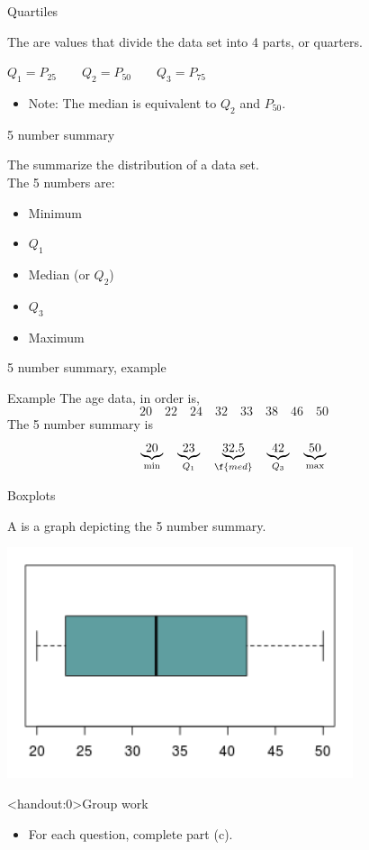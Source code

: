 \documentclass[xcolor=table, handout]{beamer}
\begin{document}
\begin{frame}{Quartiles}
\begin{block}{}
\large
The  are values that divide the data set into 4 parts, or quarters.\\
\smallskip
{\centering
$Q_1 = P_{25} \qquad Q_2 = P_{50} \qquad Q_3 = P_{75}$
\par}
\begin{itemize}
\pause
\item Note: The median is equivalent to $Q_2$ and $P_{50}$.
\end{itemize}
\end{block}
\end{frame}

\begin{frame}{5 number summary}
\begin{block}{}
\large 
The  summarize the distribution of a data set.\\
\medskip
The 5 numbers are:
\begin{itemize}
\item Minimum
\item $Q_1$
\item Median (or $Q_2$)
\item $Q_3$
\item Maximum
\end{itemize}
\end{block}
\end{frame}

\begin{frame}{5 number summary, example}
\begin{exampleblock}{Example}
The age data, in order is, 
\[20 \quad 22 \quad 24 \quad 32 \quad 33 \quad 38 \quad 46 \quad 50 \]
The 5 number summary is
\[\underbrace{20}_{\min} \quad \underbrace{23}_{Q_1} \quad \underbrace{32.5}_{\f{med}} \quad \underbrace{42}_{Q_3} \quad \underbrace{50}_{\max}\]
\end{exampleblock}
\end{frame}

\begin{frame}{Boxplots}
\begin{block}{}
\large
A  is a graph depicting the 5 number summary.
\end{block}
{\centering
\includegraphics[width=4in]{../images/ch03_boxplot}\par
}
\end{frame}


\begin{frame}<handout:0>{Group work}
\begin{block}{}
\large
\begin{itemize}
\item For each question, complete part (c).
\end{itemize}
\end{block}
\end{frame}
\end{document}
